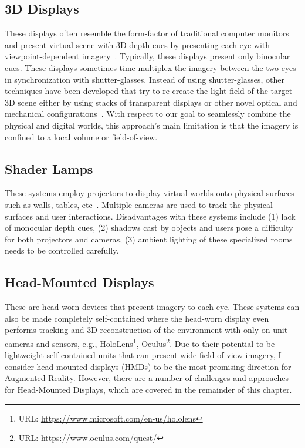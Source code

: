 \subsection{3D Displays}
\label{sec:background:3d_displays}
These displays often resemble the form-factor of traditional computer monitors and present virtual scene with 3D depth cues by presenting each eye with viewpoint-dependent imagery~\cite{geng2013three,holliman2011three}. 
Typically, these displays present only binocular cues. 
These displays sometimes time-multiplex the imagery between the two eyes in synchronization with shutter-glasses. 
Instead of using shutter-glasses, other techniques have been developed that try to re-create the light field of the target 3D scene either by using stacks of transparent displays or other novel optical and mechanical configurations~\cite{Wetzstein2012,Jones2007Rendering}. 
With respect to our goal to seamlessly combine the physical and digital worlds, this approach’s main limitation is that the imagery is confined to a local volume or field-of-view.

\subsection{Shader Lamps}
\label{sec:background:shader_lamps}
These systems employ projectors to display virtual worlds onto physical surfaces such as walls, tables, etc~\cite{Bimber:2008,raskar1998office,jones2013illumiroom}. 
Multiple cameras are used to track the physical surfaces and user interactions. 
Disadvantages with these systems include 
(1) lack of monocular depth cues, 
(2) shadows cast by objects and users pose a difficulty for both projectors and cameras, 
(3) ambient lighting of these specialized rooms needs to be controlled carefully.

\subsection{Head-Mounted Displays}
These are head-worn devices that present imagery to each eye. 
These systems can also be made completely self-contained where the head-worn display even performs tracking and 3D reconstruction of the environment with only on-unit cameras and sensors, e.g., HoloLens\footnote{URL: \href{https://www.microsoft.com/en-us/hololens}{https://www.microsoft.com/en-us/hololens}}, Oculus\footnote{URL: \href{https://www.oculus.com/quest/}{https://www.oculus.com/quest/}}.
Due to their potential to be lightweight self-contained units that can present wide field-of-view imagery, I consider head mounted displays (HMDs) to be the most promising direction for Augmented Reality. 
However, there are a number of challenges and approaches for Head-Mounted Displays, which are covered in the remainder of this chapter.

